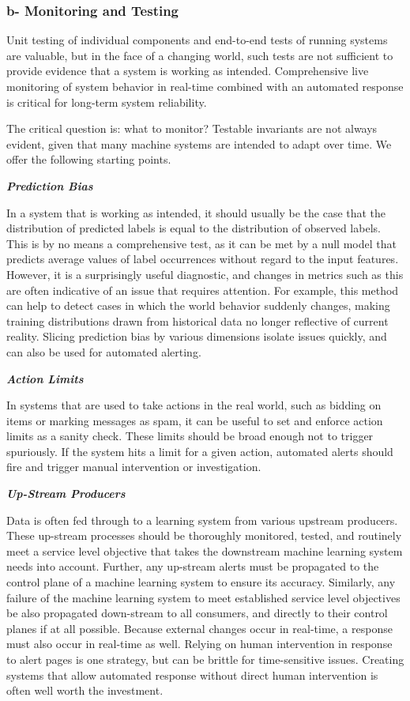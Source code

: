\documentclass[]{article}
\begin{document}
\subsubsection{b- Monitoring and
Testing}\label{b--monitoring-and-testing}

Unit testing of individual components and end-to-end tests of running
systems are valuable, but in the face of a changing world, such tests
are not sufficient to provide evidence that a system is working as
intended. Comprehensive live monitoring of system behavior in real-time
combined with an automated response is critical for long-term system
reliability.

The critical question is: what to monitor? Testable invariants are not
always evident, given that many machine systems are intended to adapt
over time. We offer the following starting points.

\textbf{\emph{Prediction Bias}}

In a system that is working as intended, it should usually be the case
that the distribution of predicted labels is equal to the distribution
of observed labels. This is by no means a comprehensive test, as it can
be met by a null model that predicts average values of label occurrences
without regard to the input features. However, it is a surprisingly
useful diagnostic, and changes in metrics such as this are often
indicative of an issue that requires attention. For example, this method
can help to detect cases in which the world behavior suddenly changes,
making training distributions drawn from historical data no longer
reflective of current reality. Slicing prediction bias by various
dimensions isolate issues quickly, and can also be used for automated
alerting.

\textbf{\emph{Action Limits}}

In systems that are used to take actions in the real world, such as
bidding on items or marking messages as spam, it can be useful to set
and enforce action limits as a sanity check. These limits should be
broad enough not to trigger spuriously. If the system hits a limit for a
given action, automated alerts should fire and trigger manual
intervention or investigation.

\textbf{\emph{Up-Stream Producers}}

Data is often fed through to a learning system from various upstream
producers. These up-stream processes should be thoroughly monitored,
tested, and routinely meet a service level objective that takes the
downstream machine learning system needs into account. Further, any
up-stream alerts must be propagated to the control plane of a machine
learning system to ensure its accuracy. Similarly, any failure of the
machine learning system to meet established service level objectives be
also propagated down-stream to all consumers, and directly to their
control planes if at all possible. Because external changes occur in
real-time, a response must also occur in real-time as well. Relying on
human intervention in response to alert pages is one strategy, but can
be brittle for time-sensitive issues. Creating systems that allow
automated response without direct human intervention is often well worth
the investment.
\end{document}
